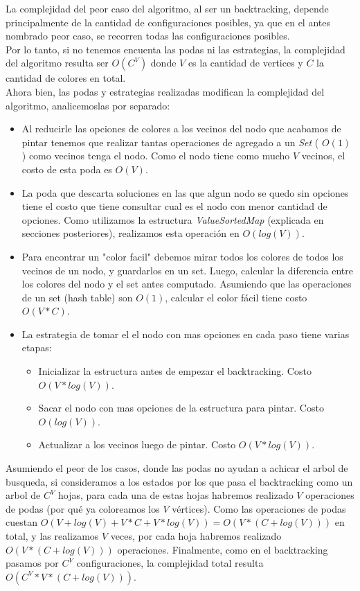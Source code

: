 La complejidad del peor caso del algoritmo, al ser un backtracking, depende principalmente de la cantidad de configuraciones posibles, ya que en el antes nombrado peor caso, se recorren todas las configuraciones posibles. \\
Por lo tanto, si no tenemos encuenta las podas ni las estrategias, la complejidad del algoritmo resulta ser $O(C^{V})$ donde $V$ es la cantidad de vertices y $C$ la cantidad de colores en total. \\

Ahora bien, las podas y estrategias realizadas modifican la complejidad del algoritmo, analicemoslas por separado:
\begin{itemize}
\item Al reducirle las opciones de colores a los vecinos del nodo que acabamos de pintar tenemos que realizar tantas operaciones de agregado a un \textit{Set} ( $O(1)$ ) como vecinos tenga el nodo. Como el nodo tiene como mucho $V$ vecinos, el costo de esta poda es $O(V)$.
\item La poda que descarta soluciones en las que algun nodo se quedo sin opciones tiene el costo que tiene consultar cual es el nodo con menor cantidad de opciones. Como utilizamos la estructura \textit{ValueSortedMap} (explicada en secciones posteriores), realizamos esta operación en $O(log(V))$.
\item Para encontrar un "color facil" debemos mirar todos los colores de todos los vecinos de un nodo, y guardarlos en un set. Luego, calcular la diferencia entre los colores del nodo y el set antes computado. Asumiendo que las operaciones de un set (hash table) son $O(1)$, calcular el color fácil tiene costo $O(V * C)$.
\item La estrategia de tomar el el nodo con mas opciones en cada paso tiene varias etapas:
	\begin{itemize}
	\item Inicializar la estructura antes de empezar el backtracking. Costo $O(V * log(V))$.
	\item Sacar el nodo con mas opciones de la estructura para pintar. Costo $O(log(V))$.
	\item Actualizar a los vecinos luego de pintar. Costo $O(V * log(V))$.
	\end{itemize}
\end{itemize}

Asumiendo el peor de los casos, donde las podas no ayudan a achicar el arbol de busqueda, si consideramos a los estados por los que pasa el backtracking como un arbol de $C^{V}$ hojas, para cada una de estas hojas habremos realizado $V$ operaciones de podas (por qué ya coloreamos los $V$ vértices). Como las operaciones de podas cuestan $O(V + log(V) + V* C + V * log(V)) = O(V * (C + log(V)))$ en total, y las realizamos $V$ veces, por cada hoja habremos realizado $O(V * (C + log(V)))$ operaciones. Finalmente, como en el backtracking pasamos por $C^{V}$ configuraciones, la complejidad total resulta $O(C^{V} * V * (C + log(V)))$.
